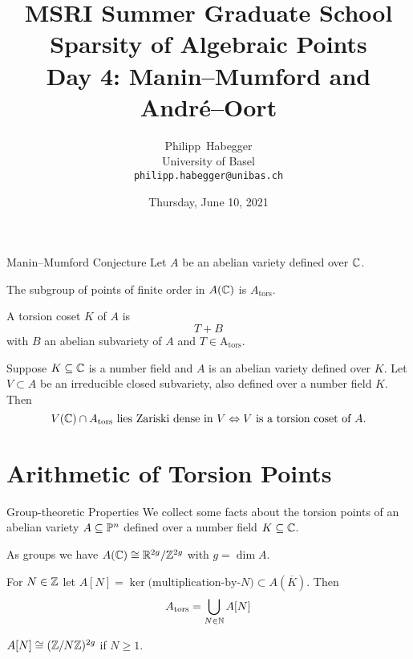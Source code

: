 \documentclass{beamer}
\title{MSRI Summer Graduate School \\ Sparsity of Algebraic Points \\
  Day 4: Manin--Mumford and Andr\'e--Oort}
\author{Philipp~Habegger \\ University of Basel \\ \texttt{philipp.habegger@unibas.ch}}
\date{Thursday, June 10, 2021}
\begin{document}
\setlength{\abovecaptionskip}{0pt} 
\setlength{\belowcaptionskip}{0pt} 

\renewcommand{\figurename}{Fig.}


\begin{frame}
  \titlepage
\end{frame}

\begin{frame}{Manin--Mumford Conjecture}
  Let $A$ be an abelian variety defined over ${\mathbb{C}}$.
  
  \begin{definition}
    The subgroup of points of finite order in $A({\mathbb{C}})$ is
    $A_{\mathrm{tors}}$.
    
    A \alert{torsion coset} $K$ of $A$
    is
    $$ T+B $$
    with $B$ an abelian subvariety of $A$ and $T\in\mathrm{A}_{\mathrm{tors}}$. 
  \end{definition}

  \begin{theorem}

  Suppose $K\subseteq{\mathbb{C}}$ is a number field and $A$ is an abelian
  variety defined over $K$. 
  Let $V\subset A$ be an irreducible closed subvariety, also defined over a
  number field $K$. Then
  \begin{equation*}
    V({\mathbb{C}}) \cap A_{\mathrm{tors}} \text{ lies Zariski dense in
      $V$}\Leftrightarrow 
    \text{$V$ is a torsion coset of $A$.}
  \end{equation*}
\end{theorem}
\end{frame}

\section{Arithmetic of Torsion Points}

\begin{frame}{Group-theoretic Properties} 
  We collect some facts about the torsion points of an
  abelian variety $A\subseteq{\mathbb{P}}^n$ defined over a number field
  $K\subseteq {\mathbb{C}}$.

  As groups we have $A({\mathbb{C}}) \cong {\mathbb{R}}^{2g}/{\mathbb{Z}}^{2g}$ with $g=\dim A$.

  For $N\in{\mathbb{Z}}$ let $A[N] = \ker \text{(multiplication-by-$N$)}
  \subset A(\overline K)$.
  Then
  \begin{equation*}
    A_{\mathrm{tors}} = \bigcup_{N\in{\mathbb{N}}} A[N]
  \end{equation*}
  \begin{lemma}
    $A[N] \cong ({\mathbb{Z}}/N{\mathbb{Z}})^{2g}$ if $N\ge 1$.  
  \end{lemma}
\end{frame}
\end{document}
